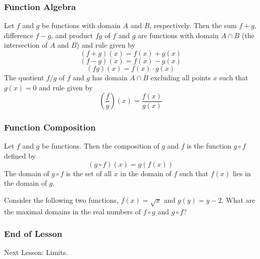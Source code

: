 \documentclass[xcolor=dvipsnames]{beamer}
\begin{document}
\begin{frame}
  \frametitle{Function Algebra}
Let $f$ and $g$ be functions with domain $A$ and $B$, respectively.
Then the \alert{sum} $f+g$, \alert{difference} $f-g$, and
\alert{product} $fg$ of $f$ and $g$ are functions with domain
$A\cap{}B$ (the intersection of $A$ and $B$) and rule given by
\begin{equation}
  \label{eq:maichong}
  (f+g)(x)=f(x)+g(x)
\end{equation}
\begin{equation}
  \label{eq:pieshouz}
  (f-g)(x)=f(x)-g(x)
\end{equation}
\begin{equation}
  \label{eq:queebeih}
  (fg)(x)=f(x)\cdot{}g(x)
\end{equation}
The \alert{quotient} $f/g$ of $f$ and $g$ has domain $A\cap{}B$
excluding all points $x$ such that $g(x)=0$ and rule given by
\begin{equation}
  \label{eq:thaochao}
  \left(\frac{f}{g}\right)(x)=\frac{f(x)}{g(x)}
\end{equation}
\end{frame}

\begin{frame}
  \frametitle{Function Composition}
Let $f$ and $g$ be functions. Then the \alert{composition} of $g$ and $f$ is
the function $g\circ{}f$ defined by
\begin{equation}
  \label{eq:aphiepae}
  (g\circ{}f)(x)=g(f(x))
\end{equation}
The domain of $g\circ{}f$ is the set of all $x$ in the domain of $f$
such that $f(x)$ lies in the domain of $g$.

\medskip

Consider the following two functions, $f(x)=\sqrt{x}$ and
  $g(y)=y-2$. What are the maximal domains in the real numbers of
  $f\circ{}g$ and $g\circ{}f$?
\end{frame}

\begin{frame}
  \frametitle{End of Lesson}
Next Lesson: Limits.
\end{frame}
\end{document}
